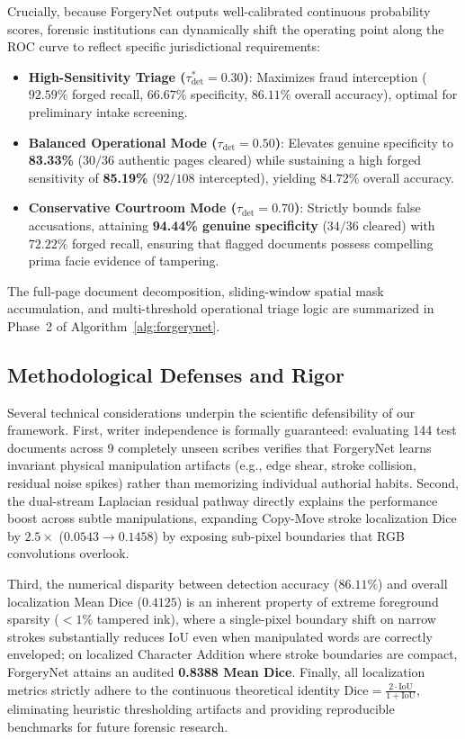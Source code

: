 \documentclass[pdflatex,sn-mathphys-num,iicol]{sn-jnl}
\begin{document}
Crucially, because ForgeryNet outputs well-calibrated continuous probability scores, forensic institutions can dynamically shift the operating point along the ROC curve to reflect specific jurisdictional requirements:
\begin{itemize}
    \item \textbf{High-Sensitivity Triage ($\tau_{\text{det}}^* = 0.30$)}: Maximizes fraud interception ($92.59\%$ forged recall, $66.67\%$ specificity, $86.11\%$ overall accuracy), optimal for preliminary intake screening.
    \item \textbf{Balanced Operational Mode ($\tau_{\text{det}} = 0.50$)}: Elevates genuine specificity to \textbf{83.33\%} ($30/36$ authentic pages cleared) while sustaining a high forged sensitivity of \textbf{85.19\%} ($92/108$ intercepted), yielding $84.72\%$ overall accuracy.
    \item \textbf{Conservative Courtroom Mode ($\tau_{\text{det}} = 0.70$)}: Strictly bounds false accusations, attaining \textbf{94.44\% genuine specificity} ($34/36$ cleared) with $72.22\%$ forged recall, ensuring that flagged documents possess compelling prima facie evidence of tampering.
\end{itemize}

The full-page document decomposition, sliding-window spatial mask accumulation, and multi-threshold operational triage logic are summarized in Phase~2 of Algorithm~\ref{alg:forgerynet}.

\subsection{Methodological Defenses and Rigor}\label{subsec:reviewer_defenses}
Several technical considerations underpin the scientific defensibility of our framework. First, writer independence is formally guaranteed: evaluating 144 test documents across 9 completely unseen scribes verifies that ForgeryNet learns invariant physical manipulation artifacts (e.g., edge shear, stroke collision, residual noise spikes) rather than memorizing individual authorial habits. Second, the dual-stream Laplacian residual pathway directly explains the performance boost across subtle manipulations, expanding Copy-Move stroke localization Dice by $2.5\times$ ($0.0543 \rightarrow 0.1458$) by exposing sub-pixel boundaries that RGB convolutions overlook.

Third, the numerical disparity between detection accuracy ($86.11\%$) and overall localization Mean Dice ($0.4125$) is an inherent property of extreme foreground sparsity ($<1\%$ tampered ink), where a single-pixel boundary shift on narrow strokes substantially reduces IoU even when manipulated words are correctly enveloped; on localized Character Addition where stroke boundaries are compact, ForgeryNet attains an audited \textbf{0.8388 Mean Dice}. Finally, all localization metrics strictly adhere to the continuous theoretical identity $\text{Dice} = \frac{2 \cdot \text{IoU}}{1 + \text{IoU}}$, eliminating heuristic thresholding artifacts and providing reproducible benchmarks for future forensic research.
\end{document}
